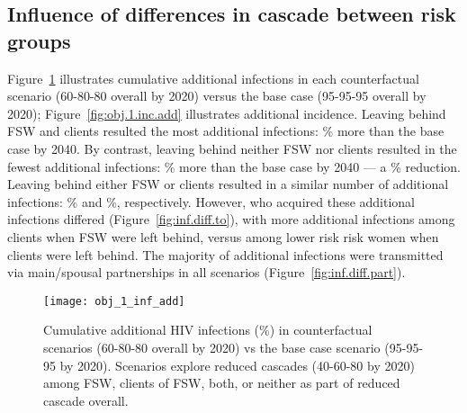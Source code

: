 \subsection{Influence of differences in cascade between risk groups}
Figure~\ref{fig:obj.1.inf.add} illustrates cumulative additional infections
in each counterfactual scenario (60-80-80 overall by 2020) versus the base case (95-95-95 overall by 2020);
Figure~\ref{fig:obj.1.inc.add} illustrates additional incidence.
Leaving behind FSW and clients resulted the most additional infections:
\% more than the base case by 2040.
By contrast, leaving behind neither FSW nor clients resulted in the fewest additional infections:
\% more than the base case by 2040 ---
a \% reduction. %
Leaving behind either FSW or clients resulted in a similar number of additional infections:
\% and \%, respectively.
However, who acquired these additional infections differed (Figure~\ref{fig:inf.diff.to}),
with more additional infections among clients when FSW were left behind,
versus among lower risk risk women when clients were left behind.
The majority of additional infections were transmitted
via main/spousal partnerships in all scenarios (Figure~\ref{fig:inf.diff.part}).
\begin{figure}[h]
  \centering
  \texttt{[image: obj\_1\_inf\_add]}
  \caption{Cumulative additional HIV infections (\%) in counterfactual scenarios (60-80-80 overall by 2020)
    vs the base case scenario (95-95-95 by 2020).
    Scenarios explore reduced cascades (40-60-80 by 2020) among FSW, clients of FSW, both, or neither
    as part of reduced cascade overall.}
  \label{fig:obj.1.inf.add}
\end{figure}
